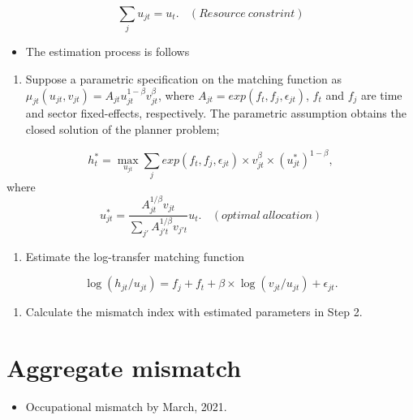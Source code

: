 \documentclass[
]{book}
\providecommand{\tightlist}{%
  \setlength{\itemsep}{0pt}\setlength{\parskip}{0pt}}
\begin{document}
\[\sum_{j}u_{jt}=u_t.\ \ \ \ (Resource\ constrint)\]

\begin{itemize}
\tightlist
\item
  The estimation process is follows
\end{itemize}

\begin{enumerate}
\def\labelenumi{\arabic{enumi}.}
\tightlist
\item
  Suppose a parametric specification on the matching function as \(\mu_{jt}(u_{jt},v_{jt})=A_{jt}u_{jt}^{1-\beta}v_{jt}^{\beta}\), where \(A_{jt}=exp(f_t,f_j,\epsilon_{jt})\), \(f_t\) and \(f_j\) are time and sector fixed-effects, respectively.
  The parametric assumption obtains the closed solution of the planner problem;
\end{enumerate}

\[h_t^*=\max_{u_{jt}} \sum_j exp(f_t,f_j,\epsilon_{jt})\times v_{jt}^{\beta}\times (u_{jt}^*)^{1-\beta},\]
where
\[u_{jt}^*=\frac{A_{jt}^{1/\beta}v_{jt}}{\sum_{j'}A_{j't}^{1/\beta}v_{j't}}u_{t}.\ \ \ \ (optimal\ allocation)\]

\begin{enumerate}
\def\labelenumi{\arabic{enumi}.}
\setcounter{enumi}{1}
\tightlist
\item
  Estimate the log-transfer matching function
\end{enumerate}

\[\log(h_{jt}/u_{jt})=f_{j}+f_{t}+\beta\times\log(v_{jt}/u_{jt})+\epsilon_{jt}.\]

\begin{enumerate}
\def\labelenumi{\arabic{enumi}.}
\setcounter{enumi}{2}
\tightlist
\item
  Calculate the mismatch index with estimated parameters in Step 2.
\end{enumerate}

\hypertarget{aggregate-mismatch}{%
\section{Aggregate mismatch}\label{aggregate-mismatch}}

\begin{itemize}
\tightlist
\item
  Occupational mismatch by March, 2021.
\end{itemize}
\end{document}

